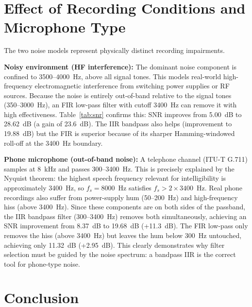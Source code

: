 \documentclass[journal]{IEEEtran}
\begin{document}
\section{Effect of Recording Conditions and Microphone Type}
\label{sec:conditions}

The two noise models represent physically distinct recording impairments.

\textbf{Noisy environment (HF interference):} The dominant noise component is
confined to 3500--4000~Hz, above all signal tones. This models real-world
high-frequency electromagnetic interference from switching power supplies or
RF sources. Because the noise is entirely out-of-band relative to the signal
tones (350--3000~Hz), an FIR low-pass filter with cutoff 3400~Hz can remove it
with high effectiveness. Table~\ref{tab:snr} confirms this: SNR improves from
5.00~dB to 28.62~dB (a gain of 23.6~dB). The IIR bandpass also helps
(improvement to 19.88~dB) but the FIR is superior because of its sharper
Hamming-windowed roll-off at the 3400~Hz boundary.

\textbf{Phone microphone (out-of-band noise):} A telephone channel (ITU-T G.711)
samples at 8~kHz and passes 300--3400~Hz. This is precisely explained by the
Nyquist theorem: the highest speech frequency relevant for intelligibility is
approximately 3400~Hz, so $f_s = 8000$~Hz satisfies $f_s > 2 \times 3400$~Hz.
Real phone recordings also suffer from power-supply hum (50--200~Hz) and
high-frequency hiss (above 3400~Hz). Since these components are on both sides
of the passband, the IIR bandpass filter (300--3400~Hz) removes both simultaneously,
achieving an SNR improvement from 8.37~dB to 19.68~dB (+11.3~dB). The FIR low-pass
only removes the hiss (above 3400~Hz) but leaves the hum below 300~Hz untouched,
achieving only 11.32~dB (+2.95~dB). This clearly demonstrates why filter selection
must be guided by the noise spectrum: a bandpass IIR is the correct tool for
phone-type noise.

\section{Conclusion}
\label{sec:conclusion}
\end{document}
